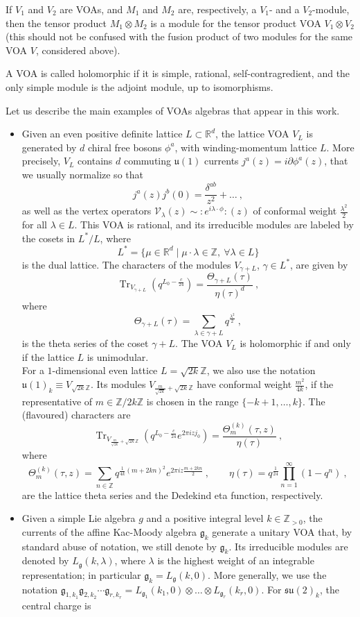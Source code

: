\documentclass[11pt,reqno]{article}
\newcommand{\be}{\begin{equation}}
\newcommand{\ee}{\end{equation}}
\DeclareMathOperator{\Tr}{Tr}
\newcommand{\ZZ}{\mathbb{Z}}
\newcommand{\RR}{\mathbb{R}}
\newcommand{\nord}[1]{:\!\! #1\!\!:}
\newcommand{\alg}[1]{\mathfrak{#1}}
\begin{document}
If $V_1$ and $V_2$ are VOAs, and $M_1$ and $M_2$ are, respectively, a $V_1$- and a $V_2$-module, then the tensor product $M_1\otimes M_2$ is a module for the tensor product VOA $V_1\otimes V_2$ (this should not be confused with the fusion product of two modules for the same VOA $V$, considered above).


A VOA is called holomorphic if it is simple, rational, self-contragredient, and the only simple module is the adjoint module, up to isomorphisms.

Let us describe the main examples of VOAs algebras that appear in this work.
\begin{itemize}
	\item Given an even positive definite lattice $L\subset \RR^d$, the lattice VOA $V_L$ is generated by $d$ chiral free bosons $\phi^a$, with winding-momentum lattice $L$. More precisely, $V_L$ contains $d$ commuting  $\alg{u}(1)$ currents $j^a(z)=i\partial \phi^a(z)$, that we usually normalize so that
	\be j^a(z)j^b(0)= \frac{\delta^{ab}}{z^2}+\ldots\ ,
	\ee
	as well as the vertex operators $\mathcal{V}_\lambda(z)\sim  \nord{e^{i\lambda\cdot \phi}}(z)$ of conformal weight $\frac{\lambda^2}{2}$ for all $\lambda\in L$. This VOA is rational, and its irreducible modules are labeled by the cosets in $L^*/L$, where 
	\be L^*=\{\mu\in \RR^d\mid \mu\cdot\lambda\in \ZZ,\ \forall \lambda\in L \}
	\ee is the dual lattice. The characters of the modules $V_{\gamma+L}$, $\gamma\in L^*$, are given by
	\be \Tr_{V_{\gamma+L}}(q^{L_0-\frac{c}{24}})=\frac{\Theta_{\gamma+L}(\tau)}{\eta(\tau)^d}\ ,
	\ee where
	\be \Theta_{\gamma+L}(\tau)=\sum_{\lambda\in \gamma+L} q^{\frac{\lambda^2}{2}}\ ,
	\ee is the theta series of the coset $\gamma+L$. The VOA $V_L$ is holomorphic if and only if the lattice $L$ is unimodular.\\
	For a $1$-dimensional even lattice $L=\sqrt{2k}\ZZ$, we also use the notation $\alg{u}(1)_k\equiv V_{\sqrt{2k}\ZZ}$. Its modules $V_{\frac{m}{\sqrt{2k}}+\sqrt{2k}\ZZ}$ have conformal weight $\frac{m^2}{4k}$, if the representative of $m\in \ZZ/2k\ZZ$ is chosen in the range $\{-k+1,\ldots,k\}$. The (flavoured) characters are
	\be \Tr_{V_{\frac{m}{\sqrt{2k}}+\sqrt{2k}\ZZ}}(q^{L_0-\frac{c}{24}}e^{2\pi i z j_0})=\frac{\Theta^{(k)}_m(\tau,z)}{\eta(\tau)} \ ,
	\ee where
	\be \Theta_m^{(k)}(\tau,z)=\sum_{n\in \ZZ} q^{\frac{1}{4k}(m+2kn)^2}e^{2\pi i z\frac{m+2kn}{2}}\ ,\qquad \eta(\tau)=q^{\frac{1}{24}}\prod_{n=1}^\infty (1-q^n)\ ,
		\ee are the lattice theta series and the Dedekind eta function, respectively. 
	\item Given a simple Lie algebra $g$ and a positive integral level $k\in \ZZ_{> 0}$, the currents of the affine Kac-Moody algebra $\alg{g}_k$ generate a unitary VOA that, by standard abuse of notation, we still denote by $\alg{g}_k$. Its irreducible modules are denoted by $L_\alg{g}(k,\lambda)$, where $\lambda$ is the highest weight of an integrable representation; in particular $\alg{g}_k=L_\alg{g}(k,0)$. More generally, we use the notation $\alg{g}_{1,k_1}\alg{g}_{2,k_2}\cdots \alg{g}_{r,k_r}=L_{\alg{g}_1}(k_1,0)\otimes\ldots\otimes L_{\alg{g}_r}(k_r,0)$. For $\alg{su}(2)_k$, the central charge is

\end{itemize}
\end{document}

